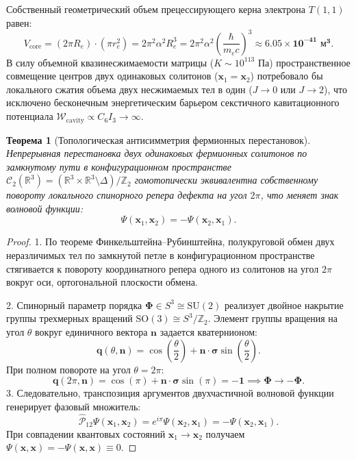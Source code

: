 \documentclass[11pt,a4paper]{article}
\newtheorem{theorem}{Теорема}[section]
\theoremstyle{definition}
\theoremstyle{remark}
\begin{document}
Собственный геометрический объем прецессирующего керна электрона $T(1,1)$ равен:
\begin{equation}
    V_{\mathrm{core}} = (2\pi R_e) \cdot (\pi r_e^2) = 2\pi^2 \alpha^2 R_e^3 = 2\pi^2 \alpha^2 \left( \frac{\hbar}{m_e c} \right)^3 \approx \mathbf{6.05 \times 10^{-41}\text{ м}^3}.
\end{equation}
В силу объемной квазинесжимаемости матрицы ($K \sim 10^{113}\text{ Па}$) пространственное совмещение центров двух одинаковых солитонов ($\mathbf{x}_1 = \mathbf{x}_2$) потребовало бы локального сжатия объема двух несжимаемых тел в один ($J \to 0$ или $J \to 2$), что исключено бесконечным энергетическим барьером секстичного кавитационного потенциала $\mathcal{W}_{\mathrm{cavity}} \propto C_6 I_3 \to \infty$.

\begin{theorem}[Топологическая антисимметрия фермионных перестановок]
Непрерывная перестановка двух одинаковых фермионных солитонов по замкнутому пути в конфигурационном пространстве $\mathcal{C}_2(\mathbb{R}^3) = (\mathbb{R}^3 \times \mathbb{R}^3 \setminus \Delta)/\mathbb{Z}_2$ гомотопически эквивалентна собственному повороту локального спинорного репера дефекта на угол $2\pi$, что меняет знак волновой функции:
\begin{equation}
    \Psi(\mathbf{x}_1, \mathbf{x}_2) = -\Psi(\mathbf{x}_2, \mathbf{x}_1).
    \label{eq:pauli_antisymmetry}
\end{equation}
\end{theorem}

\begin{proof}
1. По теореме Финкельштейна--Рубинштейна, полукруговой обмен двух неразличимых тел по замкнутой петле в конфигурационном пространстве стягивается к повороту координатного репера одного из солитонов на угол $2\pi$ вокруг оси, ортогональной плоскости обмена.

2. Спинорный параметр порядка $\boldsymbol{\Phi} \in S^3 \cong \mathrm{SU}(2)$ реализует двойное накрытие группы трехмерных вращений $\mathrm{SO}(3) \cong S^3 / \mathbb{Z}_2$. Элемент группы вращения на угол $\theta$ вокруг единичного вектора $\mathbf{n}$ задается кватернионом:
\begin{equation}
    \mathbf{q}(\theta, \mathbf{n}) = \cos\left(\frac{\theta}{2}\right) + \mathbf{n} \cdot \boldsymbol{\sigma} \sin\left(\frac{\theta}{2}\right).
\end{equation}
При полном повороте на угол $\theta = 2\pi$:
\begin{equation}
    \mathbf{q}(2\pi, \mathbf{n}) = \cos(\pi) + \mathbf{n} \cdot \boldsymbol{\sigma} \sin(\pi) = \mathbf{-1} \implies \boldsymbol{\Phi} \to -\boldsymbol{\Phi}.
\end{equation}
3. Следовательно, транспозиция аргументов двухчастичной волновой функции генерирует фазовый множитель:
\begin{equation}
    \hat{\mathcal{P}}_{12} \Psi(\mathbf{x}_1, \mathbf{x}_2) = e^{i\pi} \Psi(\mathbf{x}_2, \mathbf{x}_1) = -\Psi(\mathbf{x}_2, \mathbf{x}_1).
\end{equation}
При совпадении квантовых состояний $\mathbf{x}_1 \to \mathbf{x}_2$ получаем $\Psi(\mathbf{x}, \mathbf{x}) = -\Psi(\mathbf{x}, \mathbf{x}) \equiv 0$.
\end{proof}
\end{document}
